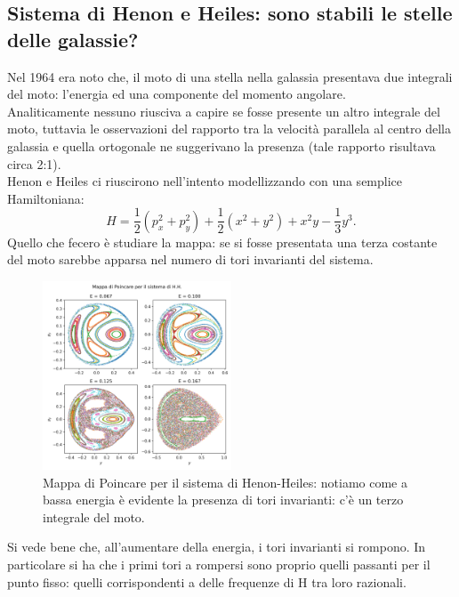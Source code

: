 \subsection{Sistema di Henon e Heiles: sono stabili le stelle delle galassie?}%
\label{sub:Sistema di Henon e Heiles}
Nel 1964 era noto che, il moto di una stella nella galassia presentava due integrali del moto: l'energia ed una componente del momento angolare.\\
Analiticamente nessuno riusciva a capire se fosse presente un altro integrale del moto, tuttavia le osservazioni del rapporto tra la velocità parallela al centro della galassia e quella ortogonale ne suggerivano la presenza (tale rapporto risultava circa 2:1).\\
Henon e Heiles ci riuscirono nell'intento modellizzando con una semplice Hamiltoniana:
\[
    H = \frac{1}{2}(p_x^2+p_y^2) + \frac{1}{2}(x^2+y^2) + x^2y-\frac{1}{3}y^3
.\] 
Quello che fecero è studiare la mappa: se si fosse presentata una terza costante del moto sarebbe apparsa nel numero di tori invarianti del sistema.
\begin{figure}[H]
    \centering
    \includegraphics[width=0.5\textwidth]{figures/18_Henon-Heiles.png}
    \caption{\scriptsize Mappa di Poincare per il sistema di Henon-Heiles: notiamo come a bassa energia è evidente la presenza di tori invarianti: c'è un terzo integrale del moto.}
    \label{fig:}
\end{figure}
\noindent
Si vede bene che, all'aumentare della energia, i tori invarianti si rompono. In particolare si ha che i primi tori a rompersi sono proprio quelli passanti per il punto fisso: quelli corrispondenti a delle frequenze di H tra loro razionali.
